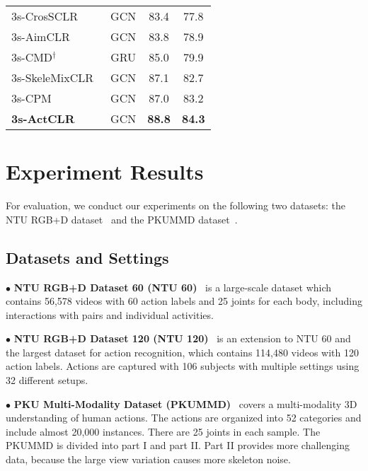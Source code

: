 \documentclass[twocolumn]{article}
\begin{document}
\begin{table}[tb]
\begin{tabular}{l|c|c|c}
      3s-CrosSCLR~\cite{li20213d} & GCN & 83.4 & 77.8\\
      3s-AimCLR~\cite{guo2021contrastive}& GCN & 83.8 & 78.9\\
      3s-CMD$^\dag$~\cite{mao2022cmd} & GRU & 85.0 & 79.9 \\
      3s-SkeleMixCLR~\cite{chen2022contrastive} & GCN & 87.1 & 82.7\\
      3s-CPM~\cite{zhang2022contrastive} & GCN & 87.0 & 83.2\\
      \textbf{3s-ActCLR} & GCN & \textbf{88.8} &\textbf{84.3}\\
      \bottomrule
    \end{tabular}
    \label{tab:unsupervised_ntu_60}
  \end{table}
  


\section{Experiment Results}

For evaluation, we conduct our experiments on the following two datasets: the NTU RGB+D dataset~\cite{shahroudy2016ntu,liu2019ntu} and the PKUMMD dataset~\cite{liu2020pku}. 


\subsection{Datasets and Settings}
\noindent$\bullet$ \textbf{NTU RGB+D Dataset 60 (NTU 60)}~\cite{shahroudy2016ntu} is a large-scale dataset which contains 56,578 videos with 60 action labels and 25 joints for each body, including interactions with pairs and individual activities.

\vspace{1mm}

\noindent$\bullet$ \textbf{NTU RGB+D Dataset 120 (NTU 120)}~\cite{liu2019ntu} is an extension to NTU 60 and the largest dataset for action recognition, which contains 114,480 videos with 120 action labels. Actions are captured with 106 subjects with multiple settings using 32 different setups.


\vspace{1mm}

\noindent$\bullet$ \textbf{PKU Multi-Modality Dataset (PKUMMD)}~\cite{liu2020pku} covers a multi-modality 3D understanding of human actions. The actions are organized into 52 categories and include almost 20,000 instances. There are 25 joints in each sample. The PKUMMD is divided into part I and part II. Part II provides more challenging data, because the large view variation causes more skeleton noise.
\end{document}

